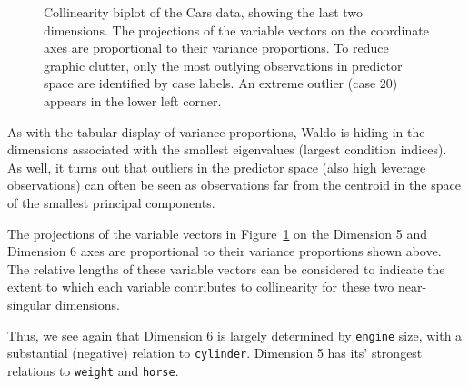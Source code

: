\documentclass[
  letterpaper,
  10pt,
  krantz2]{krantz}
\begin{document}
\begin{figure}[H]


\caption{\label{fig-cars-collin-biplot}Collinearity biplot of the Cars
data, showing the last two dimensions. The projections of the variable
vectors on the coordinate axes are proportional to their variance
proportions. To reduce graphic clutter, only the most outlying
observations in predictor space are identified by case labels. An
extreme outlier (case 20) appears in the lower left corner.}

\end{figure}%

As with the tabular display of variance proportions, Waldo is hiding in
the dimensions associated with the smallest eigenvalues (largest
condition indices).\\
As well, it turns out that outliers in the predictor space (also high
leverage observations) can often be seen as observations far from the
centroid in the space of the smallest principal components.

The projections of the variable vectors in
Figure~\ref{fig-cars-collin-biplot} on the Dimension 5 and Dimension 6
axes are proportional to their variance proportions shown above. The
relative lengths of these variable vectors can be considered to indicate
the extent to which each variable contributes to collinearity for these
two near-singular dimensions.

Thus, we see again that Dimension 6 is largely determined by
\texttt{engine} size, with a substantial (negative) relation to
\texttt{cylinder}. Dimension 5 has its' strongest relations to
\texttt{weight} and \texttt{horse}.
\end{document}

